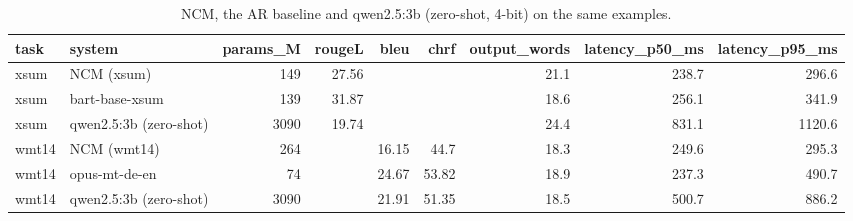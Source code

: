 \begin{table}[t]
\centering\small
\caption{NCM, the AR baseline and qwen2.5:3b (zero-shot, 4-bit) on the same examples.}
\label{tab:llm_vs_ncm}
\begin{tabular}{llrrrrrrr}
\toprule
task & system & params\_M & rougeL & bleu & chrf & output\_words & latency\_p50\_ms & latency\_p95\_ms \\
\midrule
xsum & NCM (xsum) & 149 & 27.56 &  &  & 21.1 & 238.7 & 296.6 \\
xsum & bart-base-xsum & 139 & 31.87 &  &  & 18.6 & 256.1 & 341.9 \\
xsum & qwen2.5:3b (zero-shot) & 3090 & 19.74 &  &  & 24.4 & 831.1 & 1120.6 \\
wmt14 & NCM (wmt14) & 264 &  & 16.15 & 44.7 & 18.3 & 249.6 & 295.3 \\
wmt14 & opus-mt-de-en & 74 &  & 24.67 & 53.82 & 18.9 & 237.3 & 490.7 \\
wmt14 & qwen2.5:3b (zero-shot) & 3090 &  & 21.91 & 51.35 & 18.5 & 500.7 & 886.2 \\
\bottomrule
\end{tabular}
\end{table}
